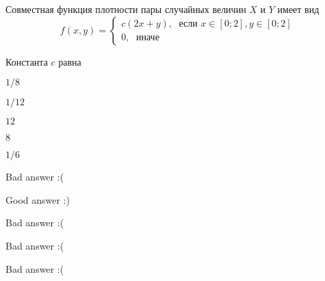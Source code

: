 
\begin{question}
Совместная функция плотности пары случайных величин \(X\) и \(Y\) имеет
вид \[
f(x,y)=\begin{cases}
c (2x+y), \; \text{ если } x\in[0;2], y\in [0;2] \\
0, \; \text{ иначе}
\end{cases}
\]

Константа \(c\) равна
\begin{answerlist}
  \item \(1/8\)
  \item \(1/12\)
  \item \(12\)
  \item \(8\)
  \item \(1/6\)
\end{answerlist}
\end{question}

\begin{solution}
\begin{answerlist}
  \item Bad answer :(
  \item Good answer :)
  \item Bad answer :(
  \item Bad answer :(
  \item Bad answer :(
\end{answerlist}
\end{solution}

